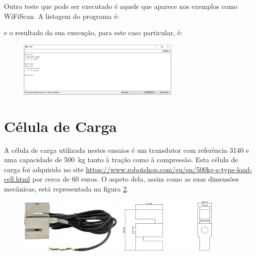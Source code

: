 \documentclass{article}
\begin{document}
\begin{enumerate}
Outro teste que pode ser executado é aquele que aparece nos exemplos como WiFiScan. A listagem do programa é:

e o resultado da sua execução, para este caso particular, é:
\begin{figure}[htb!]
\centering
\includegraphics[width=0.7\textwidth]{Figuras/Fig9.png}
\label{fig:fig6}
\end{figure}

\end{enumerate}

\section{Célula de Carga}

A célula de carga utilizada nestes ensaios é um transdutor com referência 3140 e uma capacidade de 500~kg tanto à tração como à compressão. Esta célula de carga foi adquirida no site \url{https://www.robotshop.com/eu/en/500kg-s-type-load-cell.html} por cerca de 60 euros. O aspeto dela, assim como as suas dimensões mecânicas, está representada na figura \ref{fig:fig11}.

\begin{figure}[htb!]
\centering
\includegraphics[width=0.45\textwidth]{Figuras/Fig11.png}
\includegraphics[width=0.45\textwidth]{Figuras/Fig14.png}
\label{fig:fig11}
\end{figure}
\end{document}
